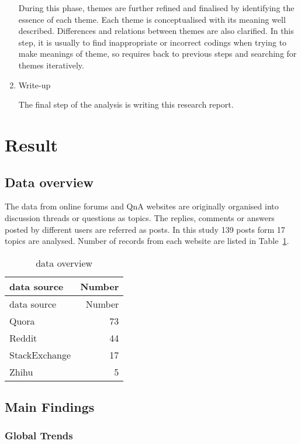 \documentclass[
  12pt,
  a4paper,
]{article}
\begin{document}
\begin{enumerate}
  During this phase, themes are further refined and finalised by
  identifying the essence of each theme. Each theme is conceptualised
  with its meaning well described. Differences and relations between
  themes are also clarified. In this step, it is usually to find
  inappropriate or incorrect codings when trying to make meanings of
  theme, so requires back to previous steps and searching for themes
  iteratively.
\item
  Write-up

  The final step of the analysis is writing this research report.
\end{enumerate}

\hypertarget{sec:result}{%
\section{Result}\label{sec:result}}

\hypertarget{data-overview}{%
\subsection{Data overview}\label{data-overview}}

The data from online forums and QnA websites are originally organised
into discussion threads or questions as topics. The replies, comments or
answers posted by different users are referred as posts. In this study
139 posts form 17 topics are analysed. Number of records from each
website are listed in Table~\ref{tbl:data-overview}.

\hypertarget{tbl:data-overview}{}
\begin{longtable}[]{@{}lr@{}}
\caption{\label{tbl:data-overview}data overview}\tabularnewline
\toprule
data source & Number\tabularnewline
\midrule
\endfirsthead
\toprule
data source & Number\tabularnewline
\midrule
\endhead
Quora & 73\tabularnewline
Reddit & 44\tabularnewline
StackExchange & 17\tabularnewline
Zhihu & 5\tabularnewline
\bottomrule
\end{longtable}

\hypertarget{main-findings}{%
\subsection{Main Findings}\label{main-findings}}

\hypertarget{sec:trends}{%
\subsubsection{Global Trends}\label{sec:trends}}
\end{document}
